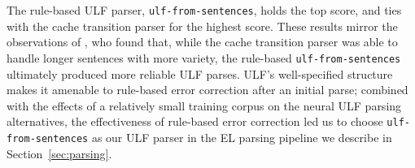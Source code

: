 The rule-based ULF parser, \texttt{ulf-from-sentences}, holds the top \elsmatch score, and ties with the cache transition parser for the highest \sembleu score. These results mirror the observations of \citet{kim2021naloma}, who found that, while the cache transition parser was able to handle longer sentences with more variety, the rule-based \texttt{ulf-from-sentences} ultimately produced more reliable ULF parses. ULF's well-specified structure makes it amenable to rule-based error correction after an initial parse; combined with the effects of a relatively small training corpus on the neural ULF parsing alternatives, the effectiveness of rule-based error correction led us to choose \texttt{ulf-from-sentences} as our ULF parser in the EL parsing pipeline we describe in Section~\ref{sec:parsing}.